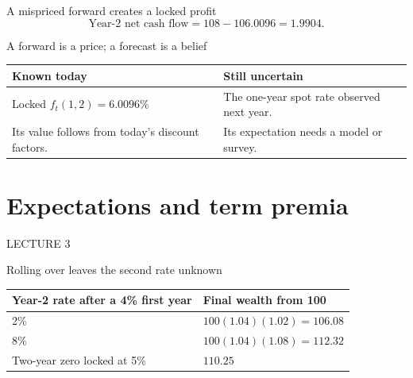 \documentclass[12pt,aspectratio=169]{beamer}
\begin{document}

\begin{frame}{A mispriced forward creates a locked profit}
\[\text{Year-2 net cash flow}=108-106.0096=1.9904.\]
\end{frame}


\begin{frame}{A forward is a price; a forecast is a belief}
\begin{center}\begin{tabular}{@{}>{\raggedright\arraybackslash}p{}>{\raggedright\arraybackslash}p{}@{}}\toprule \textbf{Known today} & \textbf{Still uncertain}\\\midrule Locked $f_t(1,2)=6.0096\%$ & The one-year spot rate observed next year.\\[2mm]
Its value follows from today’s discount factors. & Its expectation needs a model or survey.\\\bottomrule\end{tabular}\end{center}
\end{frame}

\section[Expectations and term premia]{Expectations and term premia}
\begin{frame}[plain]
{\color{Gold}\large LECTURE 3}\par\vspace{9mm}{\Huge\bfseries Expectations and term premia}\par\vspace{7mm}{\Large How much of a long yield can we interpret as a forecast?}
\end{frame}


\begin{frame}{Rolling over leaves the second rate unknown}
\begin{center}\begin{tabular}{@{}ll@{}}\toprule \textbf{Year-2 rate after a 4\% first year} & \textbf{Final wealth from 100}\\\midrule 2\% & $100(1.04)(1.02)=106.08$\\[2mm]
8\% & $100(1.04)(1.08)=112.32$\\[2mm]
Two-year zero locked at 5\% & $110.25$\\\bottomrule\end{tabular}\end{center}
\end{frame}
\end{document}
